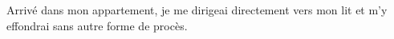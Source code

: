 \chapter[Chapitre 3]{}
Arrivé dans mon appartement, je me dirigeai directement vers mon lit et m'y effondrai sans autre forme de procès. 